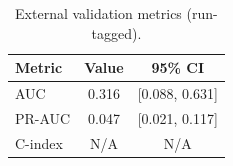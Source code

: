 \begin{table}[t]
\centering
\caption{External validation metrics (run-tagged).}
\label{tab:external_validation_PPMI_20251008_REAL_DISJOINT}
\begin{tabular}{lcc}
\toprule
Metric & Value & 95\% CI \\
\midrule
AUC & 0.316 & [0.088, 0.631] \\
PR-AUC & 0.047 & [0.021, 0.117] \\
C-index & N/A & N/A \\
\bottomrule
\end{tabular}
\end{table}
